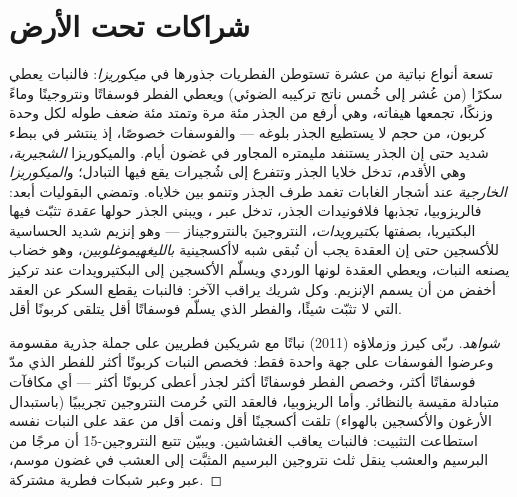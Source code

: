 \section{شراكات تحت الأرض}

\begin{proposition}\label{prop:b2:living-soil:symbiosis}
تسعة أنواع نباتية من عشرة تستوطن الفطريات جذورها في
\emph{ميكوريزا}: فالنبات يعطي سكرًا (من عُشر إلى خُمس
ناتج تركيبه الضوئي) ويعطي الفطر فوسفاتًا ونتروجينًا وماءً
وزنكًا، تجمعها هيفاته، وهي أرفع من الجذر مئة مرة
وتمتد مئة ضعف طوله لكل وحدة كربون،
من حجم  لا يستطيع الجذر بلوغه --- والفوسفات
خصوصًا، إذ ينتشر في  ببطء شديد حتى إن الجذر
يستنفد مليمتره المجاور في غضون أيام.
والميكوريزا \emph{الشجيرية}، وهي الأقدم، تدخل خلايا الجذر
وتتفرع إلى شُجيرات يقع فيها التبادل؛
و\emph{الميكوريزا الخارجية} عند أشجار الغابات تغمد طرف الجذر
وتنمو بين خلاياه. وتمضي البقوليات أبعد: فالريزوبيا، تجذبها
فلافونيدات الجذر، تدخل عبر ، ويبني الجذر
حولها \emph{عقدة} تثبّت فيها البكتيريا، بصفتها
\emph{بكتيرويدات}، النتروجينَ بالنتروجيناز --- وهو إنزيم شديد
الحساسية للأكسجين حتى إن العقدة يجب أن تُبقى شبه لاأكسجينية
\emph{بالليغهيموغلوبين}، وهو خضاب يصنعه النبات، ويعطي
العقدة لونها الوردي ويسلّم الأكسجين إلى البكتيرويدات
عند تركيز أخفض من أن يسمم الإنزيم. وكل شريك
يراقب الآخر: فالنبات يقطع السكر عن العقد التي لا تثبّت
شيئًا، والفطر الذي يسلّم فوسفاتًا أقل يتلقى كربونًا أقل.
\end{proposition}
\begin{proof}[شواهد]
ربّى كيرز وزملاؤه (2011) نباتًا مع شريكين فطريين
على جملة جذرية مقسومة وعرضوا الفوسفات على جهة واحدة فقط:
فخصص النبات كربونًا أكثر للفطر الذي مدّ فوسفاتًا
أكثر، وخصص الفطر فوسفاتًا أكثر لجذر
أعطى كربونًا أكثر --- أي مكافآت متبادلة مقيسة بالنظائر.
وأما الريزوبيا، فالعقد التي حُرمت النتروجين تجريبيًا (باستبدال
الأرغون والأكسجين بالهواء) تلقت أكسجينًا أقل
ونمت أقل من عقد على النبات نفسه استطاعت التثبيت: فالنبات
يعاقب الغشاشين. ويبيّن تتبع النتروجين-15 أن مرجًا من
البرسيم والعشب ينقل ثلث نتروجين البرسيم المثبَّت إلى
العشب في غضون موسم، عبر  وعبر شبكات فطرية
مشتركة.
\end{proof}

